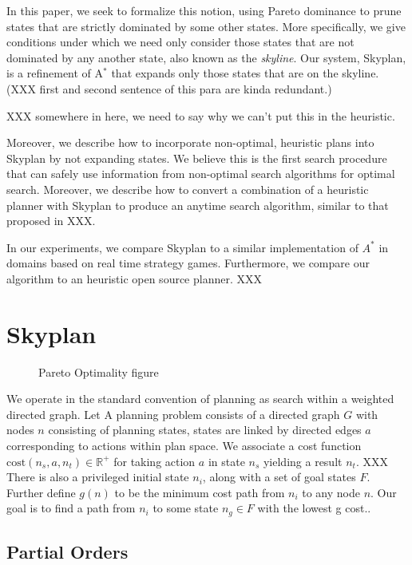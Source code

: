 \documentclass[letterpaper]{article}
\theoremstyle{plain} \newtheorem{theorem}{Theorem} \newtheorem{proposition}{Proposition} \newtheorem{lemma}{Lemma} \newtheorem*{corollary}{Corollary}
\theoremstyle{definition} \newtheorem{definition}{Definition} \newtheorem{conjecture}{Conjecture} \newtheorem*{example}{Example}
\theoremstyle{remark} \newtheorem*{remark}{Remark} \newtheorem*{note}{Note} \newtheorem{case}{Case}
\begin{document}
In this paper, we seek to formalize this notion, using Pareto
dominance to prune states that are strictly dominated by some other
states. More specifically, we give conditions under which we need
only consider those states that are not dominated by any another
state, also known as the \textit{skyline}. Our system, Skyplan, is
a refinement of A$^*$ that expands only those states that are on
the skyline. (XXX first and second sentence of this para are kinda
redundant.)

XXX somewhere in here, we need to say why we can't put this in the heuristic.

Moreover, we describe how to incorporate non-optimal, heuristic
plans into Skyplan by not expanding states.  We believe this is the
first search procedure that can safely use information from non-optimal
search algorithms for optimal search. Moreover, we describe how to
convert a combination of a heuristic planner with Skyplan to produce
an anytime search algorithm, similar to that proposed in XXX.

In our experiments, we compare Skyplan to a similar implementation of $A^*$
in domains based on real time strategy games. Furthermore, we compare
our algorithm to an heuristic open source planner. XXX

\section{Skyplan}

\begin{figure}
  \caption{Pareto Optimality figure}
\end{figure}

We operate in the standard convention of planning as search within a weighted directed graph. Let
A planning problem consists of a directed graph $G$ with nodes $n$ consisting of planning states,
states are linked by directed edges $a$ corresponding to actions within plan space. We associate
a cost function $\mathrm{cost}(n_s,a,n_t) \in \mathbb R^+$ for taking action $a$ in state $n_s$ yielding a result $n_t$.
XXX There is also a privileged initial state $n_i$, along with a set of goal states $F$. 
Further define $g(n)$ to be the minimum cost path from $n_i$ to any node $n$. Our
goal is to find a path from $n_i$ to some state $n_g \in F$ with the lowest g cost..


\subsection{Partial Orders}
\end{document}
